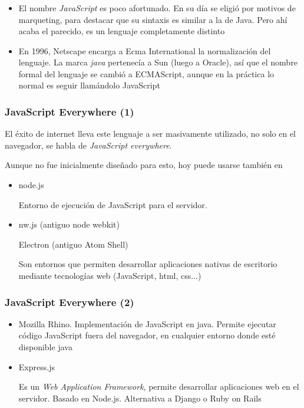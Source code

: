 \documentclass[ucs]{beamer}
\begin{document}
\begin{frame}[fragile]
\frametitle{}
\begin{itemize}
\item
El nombre \emph{JavaScript} es poco afortunado. En su día se eligió por
motivos de marqueting, para destacar que su sintaxis es similar
a la de Java. Pero ahí acaba el parecido, es un lenguaje completamente distinto

\item
En 1996, Netscape encarga a Ecma International la normalización del lenguaje.
La marca  \emph{java} pertenecía a Sun (luego a Oracle), así que el nombre
formal del lenguaje se cambió a ECMAScript, aunque en la práctica lo normal
es seguir llamándolo JavaScript
\end{itemize}
\end{frame}

\begin{frame}[fragile]
\frametitle{JavaScript Everywhere (1)}

El éxito de internet lleva este lenguaje a ser masivamente utilizado,
no solo en el navegador, se habla de 
\emph{JavaScript everywhere}.

Aunque no fue inicialmente diseñado para esto, hoy puede usarse también en
    \begin{itemize}
    \item
node.js

Entorno de ejecución de JavaScript para el servidor.
    \item
nw.js (antiguo node webkit)

Electron (antiguo Atom Shell)

Son entornos que permiten desarrollar aplicaciones nativas de escritorio
mediante tecnologías web (JavaScript, html, css...)
\end{itemize}
\end{frame}

\begin{frame}[fragile]
\frametitle{JavaScript Everywhere (2)}

\begin{itemize}
    \item
Mozilla Rhino. Implementación de JavaScript en java. Permite ejecutar
código JavaScript fuera del navegador, en cualquier entorno donde esté
disponible java
    \item
Express.js

Es un \emph{Web Application Framework}, permite desarrollar aplicaciones web en el
servidor. Basado en Node.js. Alternativa a Django o Ruby on Rails
    \end{itemize}
\end{frame}
\end{document}
